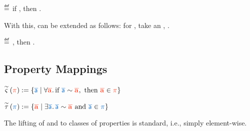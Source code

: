 \documentclass[a4paper,12pt]{article}
\begin{document}
\begin{definition}{}
    \bul{$\sat{\varWholeProg}{\varProperty}$}
    $\isdef$
    if \iul{$\forall\varRuntimeTerm\ \varTrace, %
      \progstepto{\varWholeProg}{\varRuntimeTerm}{\varTrace}$
    },
    then \oul{$\varTrace\in\varProperty$}.
\end{definition}

With this,  can be extended as follows: for , take an , .

\begin{definition}{}
  \bul{$\rsat{\varComponent}{\varProperty}$} %
  $\isdef$ %
  , %
    then \oul{$\sat{\varWholeProg}{\varProperty}$%
  }.
\end{definition}


\subsection{Property Mappings}

\begin{definition}{}
  $ 
    \mapUniversal{\sim}{\trgProperty} := 
      \lrbraces{\srcTrace \mid %
        \forall \trgTrace\ldotp \text{if }\xrelTraces{\srcTrace}{\trgTrace}, \text{ then }%
        \trgTrace\in\trgProperty
      }
  $
\end{definition}
\begin{definition}{}
  $ 
    \mapExistential{\sim}{\srcProperty} := 
      \lrbraces{\trgTrace \mid %
        \exists \srcTrace\ldotp \xrelTraces{\srcTrace}{\trgTrace} \text{ and }%
        \srcTrace\in\srcProperty
      }
  $
\end{definition}

The lifting of  and  to classes of properties is standard, i.e., simply element-wise.

\end{document}

